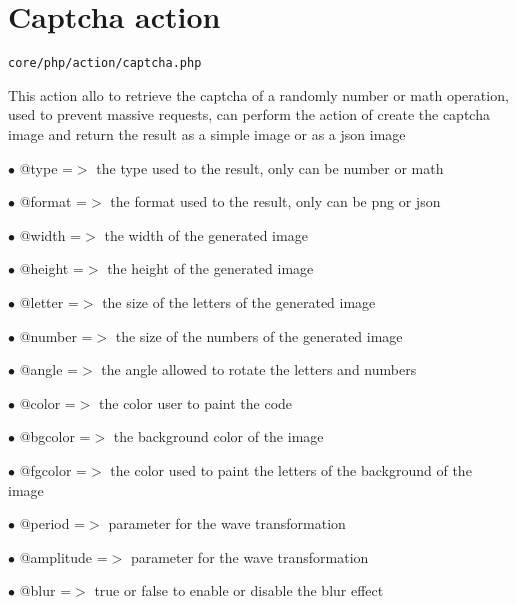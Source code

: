 \documentclass[a4paper]{book}
\begin{document}
\hypertarget{toc9}{}
\section{Captcha action}

\begin{lstlisting}
core/php/action/captcha.php
\end{lstlisting}

This action allo to retrieve the captcha of a randomly number or math
operation, used to prevent massive requests, can perform the action of
create the captcha image and return the result as a simple image or as
a json image

\begin{compactitem}
\item[\color{myblue}$\bullet$] @type   =$>$ the type used to the result, only can be number or math
\item[\color{myblue}$\bullet$] @format =$>$ the format used to the result, only can be png or json
\end{compactitem}

\begin{compactitem}
\item[\color{myblue}$\bullet$] @width     =$>$ the width of the generated image
\item[\color{myblue}$\bullet$] @height    =$>$ the height of the generated image
\item[\color{myblue}$\bullet$] @letter    =$>$ the size of the letters of the generated image
\item[\color{myblue}$\bullet$] @number    =$>$ the size of the numbers of the generated image
\item[\color{myblue}$\bullet$] @angle     =$>$ the angle allowed to rotate the letters and numbers
\item[\color{myblue}$\bullet$] @color     =$>$ the color user to paint the code
\item[\color{myblue}$\bullet$] @bgcolor   =$>$ the background color of the image
\item[\color{myblue}$\bullet$] @fgcolor   =$>$ the color used to paint the letters of the background of the image
\item[\color{myblue}$\bullet$] @period    =$>$ parameter for the wave transformation
\item[\color{myblue}$\bullet$] @amplitude =$>$ parameter for the wave transformation
\item[\color{myblue}$\bullet$] @blur      =$>$ true or false to enable or disable the blur effect
\end{compactitem}
\end{document}
